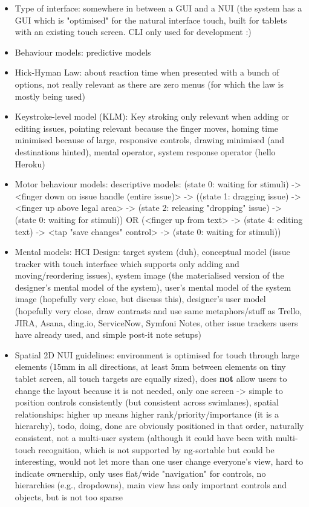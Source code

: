 \begin{itemize}
  \item Type of interface: somewhere in between a GUI and a NUI (the system has a GUI which is "optimised" for the natural interface touch, built for tablets with an existing touch screen. CLI only used for development :)
  \item Behaviour models: predictive models
  \item Hick-Hyman Law: about reaction time when presented with a bunch of options, not really relevant as there are zero menus (for which the law is mostly being used)
  \item Keystroke-level model (KLM): Key stroking only relevant when adding or editing issues, pointing relevant because the finger moves, homing time minimised because of large, responsive controls, drawing minimised (and destinations hinted), mental operator, system response operator (hello Heroku) %
  \item Motor behaviour models: descriptive models: (state 0: waiting for stimuli) -> <finger down on issue handle (entire issue)> -> ((state 1: dragging issue) -> <finger up above legal area> -> (state 2: releasing "dropping" issue) -> (state 0: waiting for stimuli)) OR (<finger up from text> -> (state 4: editing text) -> <tap "save changes" control> -> (state 0: waiting for stimuli))
  \item Mental models: HCI Design: target system (duh), conceptual model (issue tracker with touch interface which supports only adding and moving/reordering issues), system image (the materialised version of the designer's mental model of the system), user's mental model of the system image (hopefully very close, but discuss this), designer's user model (hopefully very close, draw contrasts and use same metaphors/stuff as Trello, JIRA, Asana, ding.io, ServiceNow, Symfoni Notes, other issue trackers users have already used, and simple post-it note setups)
  \item Spatial 2D NUI guidelines: environment is optimised for touch through large elements (15mm in all directions, at least 5mm between elements on tiny tablet screen, all touch targets are equally sized), does \textbf{not} allow users to change the layout because it is not needed, only one screen -> simple to position controls consistently (but consistent across swimlanes), spatial relationships: higher up means higher rank/priority/importance (it is a hierarchy), todo, doing, done are obviously positioned in that order, naturally consistent, not a multi-user system (although it could have been with multi-touch recognition, which is not supported by ng-sortable but could be interesting, would not let more than one user change everyone's view, hard to indicate ownership, only uses flat/wide "navigation" for controls, no hierarchies (e.g., dropdowns), main view has only important controls and objects, but is not too sparse

\end{itemize}
